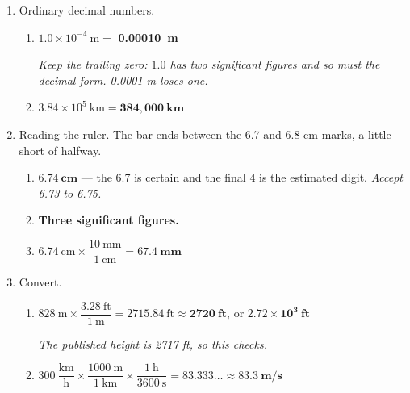 \documentclass[12pt, twoside]{article}
\begin{document}
\begin{enumerate}[itemsep=0.25cm]
\begin{enumerate}[itemsep=0.15cm]
      \emph{The third figure, 9, rounds up and carries: 1.495\ldots\ becomes 1.50.
      Write 1.50, not 1.5 --- the trailing zero is the third significant figure.}
    \item \num{0.0000000000529177}~m $= 5.29177 \times 10^{-11}$~m
      $\approx \mathbf{5.29 \times 10^{-11}~\textbf{m}}$

      \emph{Three groups of three zeros, then one more zero before the 5: ten zeros, so
      the 5 is in the 11th decimal place and the exponent is $-11$.}
  \end{enumerate}

\item Ordinary decimal numbers.
  \begin{enumerate}[itemsep=0.15cm]
    \item $1.0 \times 10^{-4}~\text{m} = $ \textbf{\num{0.00010}~m}

      \emph{Keep the trailing zero: $1.0$ has two significant figures and so must the
      decimal form. 0.0001 m loses one.}
    \item $3.84 \times 10^{5}~\text{km} = \mathbf{384{,}000~\textbf{km}}$
  \end{enumerate}

\newpage

\item Reading the ruler. The bar ends between the 6.7 and 6.8 cm marks, a little short
  of halfway.
  \begin{enumerate}[itemsep=0.15cm]
    \item $\mathbf{6.74~\textbf{cm}}$ --- the 6.7 is certain and the final 4 is the
      estimated digit. \emph{Accept 6.73 to 6.75.}
    \item \textbf{Three significant figures.}
    \item $6.74~\text{cm} \times \dfrac{10~\text{mm}}{1~\text{cm}}
      = \mathbf{67.4~\textbf{mm}}$
  \end{enumerate}

\item Convert.
  \begin{enumerate}[itemsep=0.15cm]
    \item $828~\text{m} \times \dfrac{3.28~\text{ft}}{1~\text{m}} = 2715.84~\text{ft}
      \approx \mathbf{2720~\textbf{ft}}$, or $\mathbf{2.72 \times 10^{3}~\textbf{ft}}$

      \emph{The published height is 2717 ft, so this checks.}
    \item $300~\dfrac{\text{km}}{\text{h}} \times \dfrac{1000~\text{m}}{1~\text{km}}
      \times \dfrac{1~\text{h}}{3600~\text{s}} = 83.333\ldots
      \approx \mathbf{83.3~\textbf{m/s}}$
  \end{enumerate}


\end{enumerate}
\end{document}
